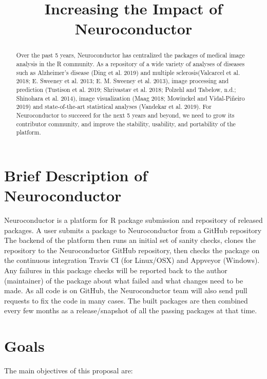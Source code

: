\documentclass[]{elsarticle} %
\begin{document}
\begin{frontmatter}

  \title{Increasing the Impact of Neuroconductor}
      
  \begin{abstract}
  Over the past 5 years, Neuroconductor has centralized the packages of
  medical image analysis in the R community. As a repository of a wide
  variety of analyses of diseases such as Alzheimer's disease (Ding et al.
  2019) and multiple sclerosis(Valcarcel et al. 2018; E. Sweeney et al.
  2013; E. M. Sweeney et al. 2013), image processing and prediction
  (Tustison et al. 2019; Shrivastav et al. 2018; Polzehl and Tabelow,
  n.d.; Shinohara et al. 2014), image visualization (Maag 2018; Mowinckel
  and Vidal-Piñeiro 2019) and state-of-the-art statistical analyses
  (Vandekar et al. 2019). For Neuroconductor to succeeed for the next 5
  years and beyond, we need to grow its contributor community, and improve
  the stability, usability, and portability of the platform.
  \end{abstract}
  
 \end{frontmatter}

\section{Brief Description of
Neuroconductor}\label{brief-description-of-neuroconductor}

Neuroconductor is a platform for R package submission and repository of
released packages. A user submits a package to Neuroconductor from a
GitHub repository The backend of the platform then runs an initial set
of sanity checks, clones the repository to the Neuroconductor GitHub
repository, then checks the package on the continuous integration Travis
CI (for Linux/OSX) and Appveyor (Windows). Any failures in this package
checks will be reported back to the author (maintainer) of the package
about what failed and what changes need to be made. As all code is on
GitHub, the Neuroconductor team will also send pull requests to fix the
code in many cases. The built packages are then combined every few
months as a release/snapshot of all the passing packages at that time.

\section{Goals}\label{goals}

The main objectives of this proposal are:
\end{document}
